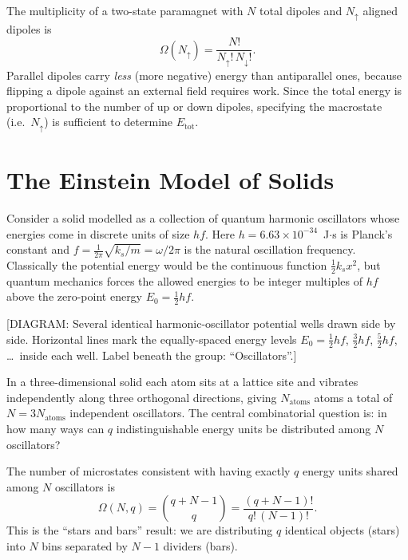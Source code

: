 

The multiplicity of a two-state paramagnet with $N$ total dipoles and $N_\uparrow$ aligned
dipoles is
\[
  \Omega(N_\uparrow) = \frac{N!}{N_\uparrow!\, N_\downarrow!}.
\]
Parallel dipoles carry \emph{less} (more negative) energy than antiparallel ones, because
flipping a dipole against an external field requires work.  Since the total energy is
proportional to the number of up or down dipoles, specifying the macrostate (i.e.\
$N_\uparrow$) is sufficient to determine $E_{\text{tot}}$.

\section{The Einstein Model of Solids}

Consider a solid modelled as a collection of quantum harmonic oscillators whose energies
come in discrete units of size $hf$.  Here $h = 6.63\times10^{-34}$~J$\cdot$s is
Planck's constant and $f = \frac{1}{2\pi}\sqrt{k_s/m} = \omega/2\pi$ is the natural
oscillation frequency.  Classically the potential energy would be the continuous function
$\frac{1}{2}k_s x^2$, but quantum mechanics forces the allowed energies to be integer
multiples of $hf$ above the zero-point energy $E_0 = \frac{1}{2}hf$.

\begin{center}
[DIAGRAM: Several identical harmonic-oscillator potential wells drawn side by side.
Horizontal lines mark the equally-spaced energy levels $E_0 = \tfrac{1}{2}hf$,
$\tfrac{3}{2}hf$, $\tfrac{5}{2}hf$, \ldots\ inside each well.  Label beneath the
group: ``Oscillators''.]
\end{center}

In a three-dimensional solid each atom sits at a lattice site and vibrates independently
along three orthogonal directions, giving $N_{\text{atoms}}$ atoms a total of
$N = 3N_{\text{atoms}}$ independent oscillators.  The central combinatorial question is:
in how many ways can $q$ indistinguishable energy units be distributed among $N$
oscillators?

\begin{formula}
The number of microstates consistent with having exactly $q$ energy units shared among
$N$ oscillators is
\[
  \Omega(N,q) = \binom{q+N-1}{q} = \frac{(q+N-1)!}{q!\,(N-1)!}.
\]
This is the ``stars and bars'' result: we are distributing $q$ identical objects (stars)
into $N$ bins separated by $N-1$ dividers (bars).
\end{formula}

